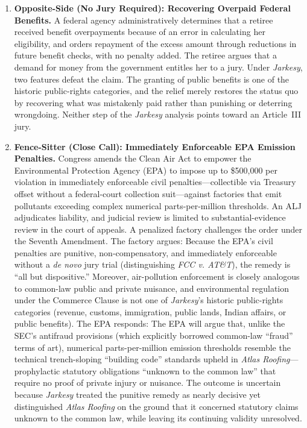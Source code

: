 \documentclass[12pt]{article}
\begin{document}
\begin{enumerate}
\item \textbf{Opposite-Side (No Jury Required): Recovering Overpaid Federal Benefits.} A federal agency administratively determines that a retiree received benefit overpayments because of an error in calculating her eligibility, and orders repayment of the excess amount through reductions in future benefit checks, with no penalty added. The retiree argues that a demand for money from the government entitles her to a jury. Under \textit{Jarkesy}, two features defeat the claim. The granting of public benefits is one of the historic public-rights categories, and the relief merely restores the status quo by recovering what was mistakenly paid rather than punishing or deterring wrongdoing. Neither step of the \textit{Jarkesy} analysis points toward an Article~III jury.

\item \textbf{Fence-Sitter (Close Call): Immediately Enforceable EPA Emission Penalties.} Congress amends the Clean Air Act to empower the Environmental Protection Agency (EPA) to impose up to \$500,000 per violation in immediately enforceable civil penalties---collectible via Treasury offset without a federal-court collection suit---against factories that emit pollutants exceeding complex numerical parts-per-million thresholds. An ALJ adjudicates liability, and judicial review is limited to substantial-evidence review in the court of appeals. A penalized factory challenges the order under the Seventh Amendment. The factory argues: Because the EPA's civil penalties are punitive, non-compensatory, and immediately enforceable without a \textit{de novo} jury trial (distinguishing \textit{FCC v. AT\&T}), the remedy is ``all but dispositive.'' Moreover, air-pollution enforcement is closely analogous to common-law public and private nuisance, and environmental regulation under the Commerce Clause is not one of \textit{Jarkesy}'s historic public-rights categories (revenue, customs, immigration, public lands, Indian affairs, or public benefits). The EPA responds: The EPA will argue that, unlike the SEC's antifraud provisions (which explicitly borrowed common-law ``fraud'' terms of art), numerical parts-per-million emission thresholds resemble the technical trench-sloping ``building code'' standards upheld in \textit{Atlas Roofing}---prophylactic statutory obligations ``unknown to the common law'' that require no proof of private injury or nuisance. The outcome is uncertain because \textit{Jarkesy} treated the punitive remedy as nearly decisive yet distinguished \textit{Atlas Roofing} on the ground that it concerned statutory claims unknown to the common law, while leaving its continuing validity unresolved.

\end{enumerate}
\end{document}
